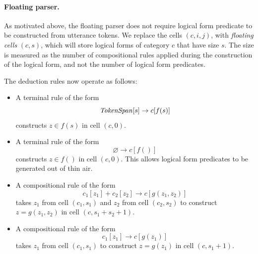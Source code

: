 \paragraph{Floating parser.}
As motivated above,
the floating parser does not require logical form predicate to
be constructed from utterance tokens.
We replace the cells $(c, i, j)$,
with \emph{floating cells} $(c, s)$,
which will store logical forms
of category $c$ that have size $s$.
The size is measured as the number of compositional rules applied
during the construction of the logical form,
and not the number of logical form predicates.

The deduction rules now operate as follows:
\begin{itemize}
\item A terminal rule of the form
\begin{equation*}
\text{\emph{TokenSpan}}[s] \to c[f(s)]
\end{equation*}
constructs $z \in f(s)$ in cell $(c, 0)$.
\item A terminal rule of the form
\begin{equation*}
\varnothing \to c[f()]
\end{equation*}
constructs $z \in f()$ in cell $(c,0)$.
This allows logical form predicates to be generated
out of thin air.
\item A compositional rule of the form
\begin{equation*}
c_1[z_1] + c_2[z_2] \to c[g(z_1, z_2)]
\end{equation*}
takes $z_1$ from cell $(c_1, s_1)$ and
$z_2$ from cell $(c_2, s_2)$
to construct $z = g(z_1, z_2)$
in cell $(c, s_1 + s_2 + 1)$.
\item A compositional rule of the form
\begin{equation*}
c_1[z_1] \to c[g(z_1)]
\end{equation*}
takes $z_1$ from cell $(c_1, s_1)$ 
to construct $z = g(z_1)$ in cell $(c, s_1 + 1)$.
\end{itemize}

